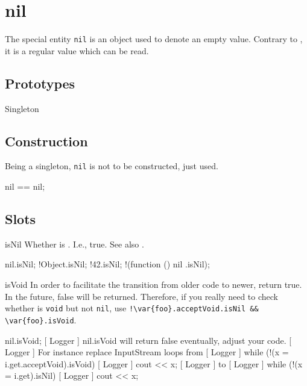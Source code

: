 
\section{nil}

The special entity \lstinline|nil| is an object used to denote an empty
value.  Contrary to , it is a regular value which can be
read.

\subsection{Prototypes}

\begin{refObjects}
\item[Singleton]
\end{refObjects}

\subsection{Construction}

Being a singleton, \lstinline|nil| is not to be constructed, just used.

\begin{urbiassert}[firstnumber=1]
nil == nil;
\end{urbiassert}

\subsection{Slots}

\begin{urbiscriptapi}
\item[isNil] Whether \this is .  I.e., true.  See also
  .
\begin{urbiassert}
nil.isNil;
!Object.isNil;  !42.isNil;  !(function () { nil }.isNil);
\end{urbiassert}


\item[isVoid] In order to facilitate the transition from older code to
  newer, return true.  In the future, false will be returned.  Therefore, if
  you really need to check whether  is \lstinline|void| but not
  \lstinline|nil|, use
  \lstinline|!\var{foo}.acceptVoid.isNil && \var{foo}.isVoid|.
\begin{urbiassert}
nil.isVoid;
[     Logger     ] nil.isVoid will return false eventually, adjust your code.
[     Logger     ]     For instance replace InputStream loops from
[     Logger     ]       while (!(x = i.get.acceptVoid).isVoid)
[     Logger     ]         cout << x;
[     Logger     ]     to
[     Logger     ]       while (!(x = i.get).isNil)
[     Logger     ]         cout << x;
\end{urbiassert}
\end{urbiscriptapi}

